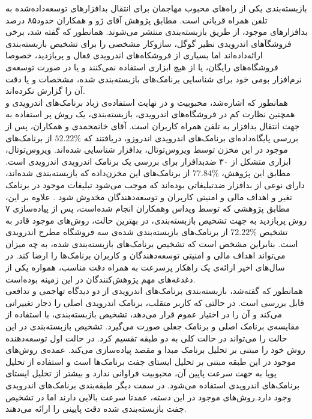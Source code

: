  بازبسته‌بندی یکی از راه‌های محبوب مهاجمان برای انتقال بدافزار‌های توسعه‌داده‌شده به تلفن‌ همراه قربانی‌ است. مطابق پژوهش آقای ژو و همکاران حدود۸۵ درصد بدافزار‌های موجود، از طریق بازبسته‌بندی منتشر می‌شوند. همانطور که گفته شد، برخی فروشگآ‌های اندرویدی نظیر گوگل، سازوکار مشخصی را برای تشخیص بازبسته‌بندی ارائه‌داده‌اند اما بسیاری از فروشکاه‌های اندرویدی فعال و پربازدید، خصوصا فروشگاه‌های رایگان، یا از هیچ ابزاری استفاده نمی‌کنند و یا در صورت توسعه‌ی نرم‌افزار بومی خود برای شناسایی برنامک‌های بازبسته‌بندی شده، مشخصات و یا دقت آن را گزارش نکرده‌اند.\\
 همانطور که اشاره‌شد، محبوبیت و در نهایت استفاده‌ی زباد برنامک‌های اندرویدی و همچنین نظارت کم در فروشگاه‌های اندرویدی، بازبسته‌بندی، یک روش پر استفاده به جهت انتقال بدافزار‌ به تلفن همراه کاربران است. آقای خانمحمدی و همکاران، پس از بررسی پایگاه‌داده‌ای برنامک‌های اندرویدی اندروزو، دریافتند که  
 $52.22\%$
 از برنامک‌های موجود در این مخزن توسط ویروس‌توتال، بدافزار شناسایی شده‌اند. ویروس‌توتال، ابزاری متشکل از ۳۰ ضد‌بدافزار برای بررسی یک برنامک اندرویدی اندرویدی است. مطابق این پژوهش، 
 $77.84\%$
 از برنامک‌های این مخزن‌داده که بازبسته‌بندی شده‌اند، دارای نوعی از بدافزار ضدتبلیغاتی بوده‌اند که موجب می‌شود تبلیغات موجود در برنامک تغیر و اهداف مالی و امنیتی کاربران و توسعه‌دهندگان مخدوش شود . علاوه بر این، مطابق پژوهشی که توسط ویداس وهمکاران انجام شده‌است، پس از پیاده‌سازی ۷ روش پربازدید به جهت تشخیص بازبسته‌بندی، در بهترین حالت‌، روش‌های موجود قادر به تشخیص 
 $72.22\%$
 از برنامک‌های بازبسته‌بندی شده‌ی سه فروشگاه مطرح اندرویدی است. بنابراین مشخص است که تشخیص برنامک‌های بازبسته‌بندی شده، به چه میزان می‌تواند اهداف مالی و امنیتی توسعه‌دهندگان و کاربران برنامک‌ها را ارضا کند. در سال‌های اخیر ارائه‌ی یک راهکار پرسرعت به همراه دقت مناسب، همواره یکی از دغدغه‌های مهم پژوهش‌کنندگان در این زمینه‌ بوده‌است.
 \\
 همانطور که گفته‌شد، بازبسته‌بندی برنامک‌های اندرویدی از دو دیدگاه تهاجمی و تدافعی قابل بررسی است. در حالتی که کاربر متقلب، برنامک اندرویدی اصلی را دجار تغییراتی می‌کند و آن را در اختیار عموم قرار می‌دهد،  تشخیص بازبسته‌بندی، با استفاده از مقایسه‌ی برنامک اصلی و برنامک جعلی صورت می‌گیرد. تشخیص بازبسته‌بندی در این حالت را می‌تواند در حالت کلی به دو طبقه تقسیم کرد. در حالت اول توسعه‌دهنده روش خود را مبتنی بر تحلیل برنامک مبدا و مقصد پیاده‌سازی می‌کند. عمده‌ی روش‌های موجود در این طبقه مبتنی بر تحلیل ایستا‌ی جفت‌ برنامک‌ها است و استفاده از تحلیل پویا به جهت سرعت پایین آن، محبوبیت فراوانی ندارد و بیشتر از تحلیل ایستای برنامک‌های اندرویدی استفاده می‌شود. در سمت دیگر طبقه‌بندی برنامک‌های اندرویدی وجود دارد.روش‌های موجود در این دسته، عمدتا سرعت بالایی دارند اما در تشخیص جفت بازبسته‌بندی شده دقت پایینی را ارائه می‌دهند.

